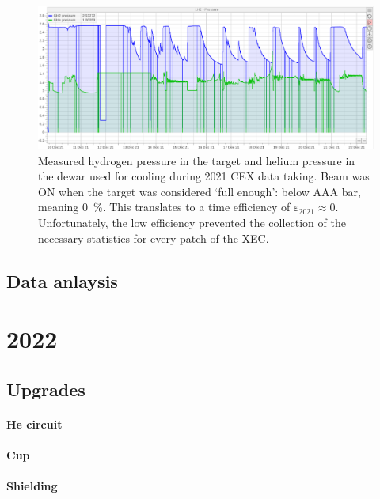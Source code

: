 \begin{refsection}
        \begin{figure}
            \centering
            \includegraphics[width = \textwidth]{Figures/LH2/2021CEX_LH2.png}
            \caption{Measured hydrogen pressure in the target and helium pressure in the dewar used for cooling during 2021 CEX data taking. 
            Beam was ON when the target was considered `full enough': below AAA bar, meaning \SI{0}{\%}. 
            This translates to a time efficiency of $\varepsilon_{2021}\approx0$. 
            Unfortunately, the low efficiency prevented the collection of the necessary statistics for every patch of the XEC.}
            \label{fig:CEX:2021:datataking}
        \end{figure}
    
    \subsection{Data anlaysis}

\section{2022}
    \subsection{Upgrades}
        \paragraph{He circuit}
        \paragraph{Cup}
        \paragraph{Shielding}
        

\end{refsection}
